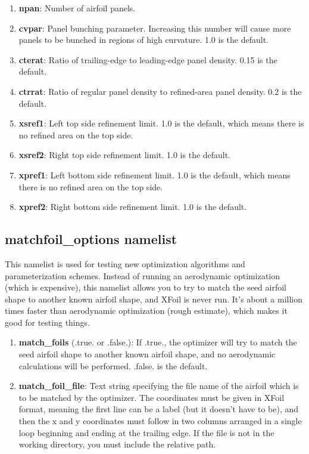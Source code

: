 \documentclass[11pt]{article}
\begin{document}
\begin{enumerate}
\item{\textbf{npan}: Number of airfoil panels.}
\item{\textbf{cvpar}: Panel bunching parameter.  Increasing this number will cause more
panels to be bunched in regions of high curvature. 1.0 is the default.}
\item{\textbf{cterat}: Ratio of trailing-edge to leading-edge panel density.  0.15 is the
default.}
\item{\textbf{ctrrat}: Ratio of regular panel density to refined-area panel density.  0.2
is the default.}
\item{\textbf{xsref1}: Left top side refinement limit.  1.0 is the default, which means
there is no refined area on the top side.}
\item{\textbf{xsref2}: Right top side refinement limit.  1.0 is the default.}
\item{\textbf{xpref1}: Left bottom side refinement limit.  1.0 is the default, which means
there is no refined area on the top side.}
\item{\textbf{xpref2}: Right bottom side refinement limit.  1.0 is the default.}
\end{enumerate}

\subsection{matchfoil\_options namelist}

This namelist is used for testing new optimization algorithms and parameterization
schemes.  Instead of running an aerodynamic optimization (which is expensive), this
namelist allows you to try to match the seed airfoil shape to another known airfoil shape,
and XFoil is never run.  It's about a million times faster than aerodynamic optimization
(rough estimate), which makes it good for testing things.

\begin{enumerate}
\item{\textbf{match\_foils} (.true. or .false.): If .true., the optimizer will try to
match the seed airfoil shape to another known airfoil shape, and no aerodynamic
calculations will be performed.  .false. is the default.}
\item{\textbf{match\_foil\_file}: Text string specifying the file name of the airfoil
which is to be matched by the optimizer.  The coordinates must be given in XFoil format,
meaning the first line can be a label (but it doesn't have to be), and then the x and y
coordinates must follow in two columns arranged in a single loop beginning and ending at
the trailing edge. If the file is not in the working directory, you must include the
relative path.}
\end{enumerate}
\end{document}

